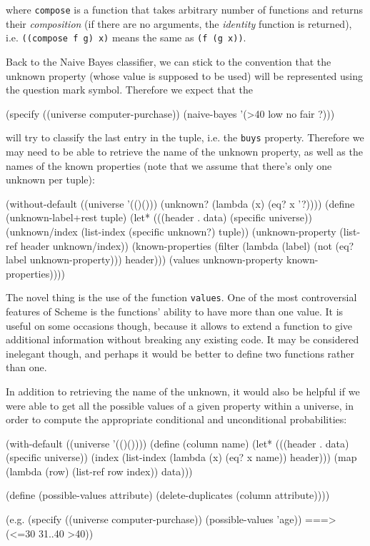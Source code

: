 where \texttt{compose} is a function that takes arbitrary
number of functions and returns their \textit{composition}
(if there are no arguments, the \textit{identity} function
is returned), i.e. \texttt{((compose f g) x)} means the
same as \texttt{(f (g x))}.

Back to the Naive Bayes classifier, we can stick to
the convention that the unknown property (whose value
is supposed to be used) will be represented using the
question mark symbol. Therefore we expect that the

\begin{Snippet}
(specify ((universe computer-purchase))
  (naive-bayes '(>40 low no fair ?)))
\end{Snippet}

will try to classify the last entry in the tuple, i.e.
the \texttt{buys} property. Therefore we may need to be able
to retrieve the name of the unknown property, as well
as the names of the known properties (note that we assume
that there's only one unknown per tuple):

\begin{Snippet}
(without-default ((universe '(()()))
                  (unknown? (lambda (x) (eq? x '?))))
  (define (unknown-label+rest tuple)
    (let* (((header . data) (specific universe))
	   (unknown/index (list-index (specific unknown?) tuple))
	   (unknown-property (list-ref header unknown/index))
           (known-properties (filter (lambda (label)
                                       (not (eq? label
                                                 unknown-property)))
				     header)))
      (values unknown-property known-properties))))
\end{Snippet}

The novel thing is the use of the function \texttt{values}.
One of the most controversial features of Scheme is the functions'
ability to have more than one value. It is useful on some
occasions though, because it allows to extend a function
to give additional information without breaking any existing
code. It may be considered inelegant though, and perhaps
it would be better to define two functions rather than one.


In addition to retrieving the name of the unknown, it would 
also be helpful if we were able to get all the possible values
of a given property within a universe, in order to compute
the appropriate conditional and unconditional probabilities:

\begin{Snippet}
(with-default ((universe '(()())))
  (define (column name)
    (let* (((header . data) (specific universe))
	   (index (list-index (lambda (x) (eq? x name)) header)))
      (map (lambda (row)
	     (list-ref row index))
	   data)))

  (define (possible-values attribute)
    (delete-duplicates (column attribute))))
\end{Snippet}
\begin{Snippet}
(e.g.
 (specify ((universe computer-purchase))
   (possible-values 'age)) ===> (<=30 31..40 >40))
\end{Snippet}

